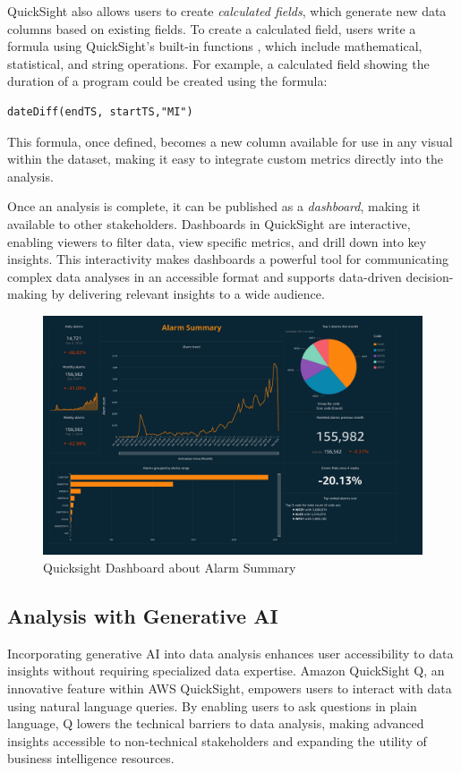 QuickSight also allows users to create \textit{calculated fields}, which generate new data columns based on existing fields. To create a calculated field, users write a formula using QuickSight's built-in functions \cite{functions}, which include mathematical, statistical, and string operations. For example, a calculated field showing the duration of a program could be created using the formula:
\begin{lstlisting}
dateDiff(endTS, startTS,"MI")
\end{lstlisting}
This formula, once defined, becomes a new column available for use in any visual within the dataset, making it easy to integrate custom metrics directly into the analysis.

Once an analysis is complete, it can be published as a \textit{dashboard}, making it available to other stakeholders. Dashboards in QuickSight are interactive, enabling viewers to filter data, view specific metrics, and drill down into key insights. This interactivity makes dashboards a powerful tool for communicating complex data analyses in an accessible format and supports data-driven decision-making by delivering relevant insights to a wide audience.
\begin{figure}[H]
    \centering
    \includegraphics[width=1\textwidth]{res/alarm_summary.pdf}
    \caption{Quicksight Dashboard about Alarm Summary}
    \label{fig:alarmsummary}
\end{figure}

\subsection{Analysis with Generative AI}

Incorporating generative AI into data analysis enhances user accessibility to data insights without requiring specialized data expertise. Amazon QuickSight Q, an innovative feature within \ac{AWS} QuickSight, empowers users to interact with data using natural language queries. By enabling users to ask questions in plain language, Q lowers the technical barriers to data analysis, making advanced insights accessible to non-technical stakeholders and expanding the utility of business intelligence resources.

